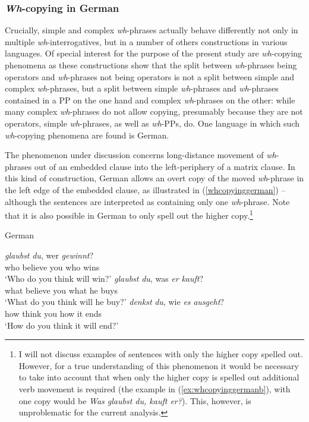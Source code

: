 \subsubsection{\textit{Wh}-copying in German}
Crucially, simple and complex \textit{wh}-phrases actually behave differently not only in multiple \textit{wh}-interrogatives, but in a number of others constructions in various languages. Of special interest for the purpose of the present study are \textit{wh}-copying phenomena as these constructions show that the split between \textit{wh}-phrases being operators and \textit{wh}-phrases not being operators is not a split between simple and complex \textit{wh}-phrases, but a split between simple \textit{wh}-phrases and \textit{wh}-phrases contained in a PP on the one hand and complex \textit{wh}-phrases on the other: while many complex \textit{wh}-phrases do not allow copying, presumably because they are not operators, simple \textit{wh}-phrases, as well as \textit{wh}-PPs, do. One language in which such \textit{wh}-copying phenomena are found is German.

The phenomenon under discussion concerns long-distance movement of \textit{wh}-phrases out of an embedded clause into the left-periphery of a matrix clause. In this kind of construction, German allows an overt copy of the moved \textit{wh}-phrase in the left edge of the embedded clause, as illustrated in (\ref{whcopyinggerman}) -- although the sentences are interpreted as containing only one \textit{wh}-phrase. Note that it is also possible in German to only spell out the higher copy.\footnote{ I will not discuss examples of sentences with only the higher copy spelled out. However, for a true understanding of this phenomenon it would be necessary to take into account that when only the higher copy is spelled out additional verb movement is required (the example in (\ref{ex:whcopyinggermanb}), with one copy would be \textit{Was glaubst du, kauft er?}). This, however, is unproblematic for the current analysis.\label{footnotewh}} 

\begin{exe}
\ex German\label{whcopyinggerman}\begin{xlist}
\ex {} {\textit{glaubst}} {\textit{du},} {wer} {\textit{gewinnt}?} \\
{who} {believe} {you} {who} {wins}\\
\trans `Who do you think will win?' \label{ex:whcopyinggermana}
\ex {} {\textit{glaubst}} {\textit{du},} {was} {\textit{er}} {\textit{kauft}?} \\
{what} {believe} {you} {what} {he} {buys}\\
\trans `What do you think will he buy?' \label{ex:whcopyinggermanb}
\ex {} {\textit{denkst}} {\textit{du},} {wie} {\textit{es}} {\textit{ausgeht}?} \\
{how} {think} {you} {how} {it} {ends}\\
\trans `How do you think it will end?' \label{ex:whcopyinggermanc}
\end{xlist}
\end{exe}

